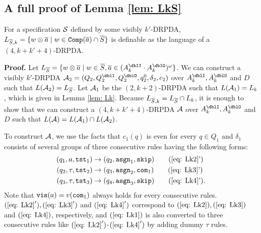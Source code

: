 \subsection{A full proof of Lemma \ref{lem: LkS}}
\setcounter{lemma}{\ref{lem: LkS}}
\addtocounter{lemma}{-1}
\begin{lemma}
For a specification ${\cal S}$ defined by some visibly $k'$-DRPDA,
$L_{{\overline{S}}, k} = \{w\otimes{\overline{a}} \mid w\in{\mathtt{Comp}}({\overline{a}})\cap {\overline{S}}\}$
is definable as the language of a $(4,k+k'+4)$-DRPDA.
\end{lemma}
{\bf Proof.}\quad
Let $L_{\overS} = \{w\otimes\overa\mid w\in\overS, \overa\in(A_k^\dblI\cdot A_k^\dblO)^\omega\}$.
We can construct a visibly $k'$-DRPDA
$\calA_2=(Q_2, Q^\dblI_2, Q^\dblO_2, q^0_2, \delta_2, c_2)$
over $A^\dblI_{k}, A^\dblO_{k}$ and $D$
such that $L({\cal A}_2)= L_{{\overline{S}}}$.
Let ${\cal A}_1$ be the $(2,k+2)$-DRPDA
such that $L({\cal A}_1)=L_k$, which is given in Lemma \ref{lem: Lk}.
Because $L_{{\overline{S}}, k} = L_{{\overline{S}}} \cap L_k$, it is enough to show that we can construct a $(4,k+k'+4)$-DRPDA ${\cal A}$
over $A^\dblI_{k}, A^\dblO_{k}$ and $D$
such that $L({\cal A})=L({\cal A}_1)\cap L({\cal A}_2)$.

To construct ${\cal A}$, we use the facts that
$c_1(q)$ is even for every $q\in Q_1$ and
$\delta_1$ consists of several groups of three consecutive rules having the following forms:
\begin{align}
(q_1, a, \tst_1) &\to (q_2,\asgn_1, \skip) \tag{\ref{eq: Lk2}'}\\
(q_2, \tau, \tst_2) &\to (q_3,\asgn_2, \com_1) \tag{\ref{eq: Lk3}'}\\
(q_3, \tau, \tst_3) &\to (q_4,\asgn_3, \skip) \tag{\ref{eq: Lk4}'}.
\end{align}
Note that $\mathtt{vis}(a)=v(\mathtt{com}_1)$ always holds for every consecutive rules.
$(\ref{eq: Lk2}'), (\ref{eq: Lk3}')$ and $(\ref{eq: Lk4}')$ correspond to $(\ref{eq: Lk2}), (\ref{eq: Lk3})$ and $(\ref{eq: Lk4})$, respectively, and $(\ref{eq: Lk1})$
is also converted to three consecutive rules like $(\ref{eq: Lk2}')$-$(\ref{eq: Lk4}')$
by adding dummy $\tau$ rules.

